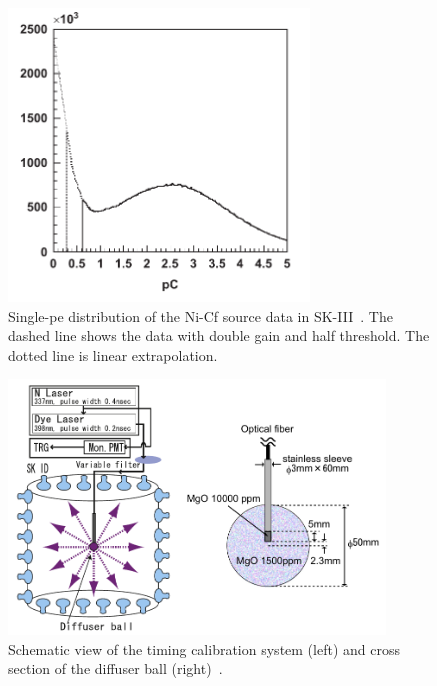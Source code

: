 \begin{figure}[tbp]
	\centering
	\includegraphics[width=8cm]{Figures/Calibration/Single-pe}
	\caption[Single-pe distribution of the Ni-Cf source data in SK-III]{\label{Calibration_Single-pe} Single-pe distribution of the Ni-Cf source data in SK-III~\cite{2014AbeCalib}. The dashed line shows the data with double gain and half threshold. The dotted line is linear extrapolation.}
\end{figure}

\begin{figure}[tbp]
	\centering
	\includegraphics[width=10cm]{Figures/Calibration/TimingCalib}
	\caption[Schematic view of the timing calibration system and cross section of the diffuser ball]{\label{Calibration_TimingCalib} Schematic view of the timing calibration system (left) and cross section of the diffuser ball (right)~\cite{2014AbeCalib}.}
\end{figure}

